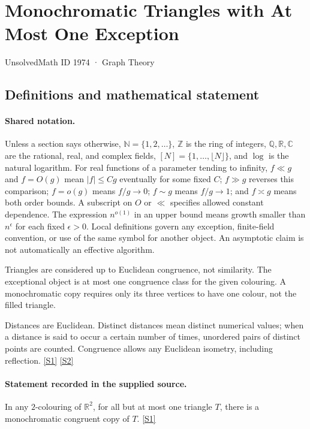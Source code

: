 \documentclass[11pt,a4paper]{article}
\newcommand{\N}{\mathbb{N}}
\newcommand{\Z}{\mathbb{Z}}
\newcommand{\Q}{\mathbb{Q}}
\newcommand{\R}{\mathbb{R}}
\newcommand{\C}{\mathbb{C}}
\newcommand{\sref}[2]{\hyperlink{source:#1:#2}{[S#2]}}
\begin{document}

\setcounter{section}{1973}

\section{Monochromatic Triangles with At Most One Exception}\label{1974}

{\small\sffamily UnsolvedMath ID 1974 · Graph Theory}

\subsection{Definitions and mathematical statement}

\paragraph{Shared notation.}Unless a section says otherwise, $\N=\{1,2,\ldots\}$,
$\Z$ is the ring of integers, $\Q,\R,\C$ are the rational, real, and complex
fields, $[N]=\{1,\ldots,\lfloor N\rfloor\}$, and $\log$ is the natural
logarithm. For real functions of a parameter tending to infinity,
$f\ll g$ and $f=O(g)$ mean $|f|\leq Cg$ eventually for some fixed $C$;
$f\gg g$ reverses this comparison; $f=o(g)$ means $f/g\to0$;
$f\sim g$ means $f/g\to1$; and $f\asymp g$ means both order bounds.
A subscript on $O$ or $\ll$ specifies allowed constant dependence.
The expression $n^{o(1)}$ in an upper bound means growth smaller than
$n^\epsilon$ for each fixed $\epsilon>0$. Local definitions govern any
exception, finite-field convention, or use of the same symbol for another
object. An asymptotic claim is not automatically an effective algorithm.



Triangles are considered up to Euclidean congruence, not similarity. The exceptional object is at most one congruence class for the given colouring. A monochromatic copy requires only its three vertices to have one colour, not the filled triangle.

Distances are Euclidean. Distinct distances mean distinct numerical values; when a distance is said to occur a certain number of times, unordered pairs of distinct points are counted. Congruence allows any Euclidean isometry, including reflection. \sref{1974}{1} \sref{1974}{2}

\paragraph{Statement recorded in the supplied source.}
In any $2$-colouring of $\mathbb{R}^2$, for all but at most one triangle $T$, there is a monochromatic congruent copy of $T$. \sref{1974}{1}
\end{document}

